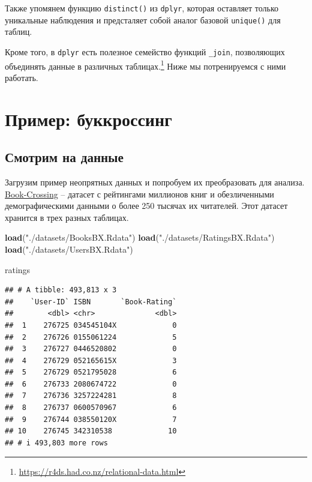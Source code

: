 \documentclass[
]{book}
\newenvironment{Shaded}{\begin{snugshade}}{\end{snugshade}}
\newcommand{\FunctionTok}[1]{\textcolor[rgb]{0.13,0.29,0.53}{\textbf{#1}}}
\newcommand{\NormalTok}[1]{#1}
\newcommand{\StringTok}[1]{\textcolor[rgb]{0.31,0.60,0.02}{#1}}
\theoremstyle{definition}
\theoremstyle{definition}
\theoremstyle{definition}
\theoremstyle{definition}
\theoremstyle{remark}
\begin{document}
Также упомянем функцию \texttt{distinct()} из \texttt{dplyr}, которая оставляет только уникальные наблюдения и предсталяет собой аналог базовой \texttt{unique()} для таблиц.

Кроме того, в \texttt{dplyr} есть полезное семейство функций \texttt{\_join}, позволяющих объединять данные в различных таблицах.\footnote{\url{https://r4ds.had.co.nz/relational-data.html}} Ниже мы потренируемся с ними работать.

\hypertarget{ux43fux440ux438ux43cux435ux440-ux431ux443ux43aux43aux440ux43eux441ux441ux438ux43dux433}{%
\section{Пример: буккроссинг}\label{ux43fux440ux438ux43cux435ux440-ux431ux443ux43aux43aux440ux43eux441ux441ux438ux43dux433}}

\hypertarget{ux441ux43cux43eux442ux440ux438ux43c-ux43dux430-ux434ux430ux43dux43dux44bux435}{%
\subsection{Смотрим на данные}\label{ux441ux43cux43eux442ux440ux438ux43c-ux43dux430-ux434ux430ux43dux43dux44bux435}}

Загрузим пример неопрятных данных и попробуем их преобразовать для анализа. \href{http://www2.informatik.uni-freiburg.de/~cziegler/BX/}{Book-Crossing} -- датасет с рейтингами миллионов книг и обезличенными демографическими данными о более 250 тысячах их читателей. Этот датасет хранится в трех разных таблицах.

\begin{Shaded}
\begin{Highlighting}[]
\FunctionTok{load}\NormalTok{(}\StringTok{"./datasets/BooksBX.Rdata"}\NormalTok{)}
\FunctionTok{load}\NormalTok{(}\StringTok{"./datasets/RatingsBX.Rdata"}\NormalTok{)}
\FunctionTok{load}\NormalTok{(}\StringTok{"./datasets/UsersBX.Rdata"}\NormalTok{)}

\NormalTok{ratings}
\end{Highlighting}
\end{Shaded}

\begin{verbatim}
## # A tibble: 493,813 x 3
##    `User-ID` ISBN       `Book-Rating`
##        <dbl> <chr>              <dbl>
##  1    276725 034545104X             0
##  2    276726 0155061224             5
##  3    276727 0446520802             0
##  4    276729 052165615X             3
##  5    276729 0521795028             6
##  6    276733 2080674722             0
##  7    276736 3257224281             8
##  8    276737 0600570967             6
##  9    276744 038550120X             7
## 10    276745 342310538             10
## # i 493,803 more rows
\end{verbatim}
\end{document}

